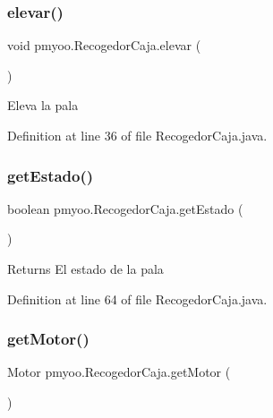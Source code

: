 \mbox{\label{classpmyoo_1_1_recogedor_caja_a94c5cdce71ce343490aa39101e551717}} 
\subsubsection{\texorpdfstring{elevar()}{elevar()}}
{\footnotesize\ttfamily void pmyoo.\+Recogedor\+Caja.\+elevar (\begin{DoxyParamCaption}{ }\end{DoxyParamCaption})}

Eleva la pala 

Definition at line 36 of file Recogedor\+Caja.\+java.

\mbox{\label{classpmyoo_1_1_recogedor_caja_a6c8a3ab0cdcfe6037f82de19791dfa39}} 
\subsubsection{\texorpdfstring{getEstado()}{getEstado()}}
{\footnotesize\ttfamily boolean pmyoo.\+Recogedor\+Caja.\+get\+Estado (\begin{DoxyParamCaption}{ }\end{DoxyParamCaption})}

\begin{DoxyReturn}{Returns}
El estado de la pala 
\end{DoxyReturn}


Definition at line 64 of file Recogedor\+Caja.\+java.

\mbox{\label{classpmyoo_1_1_recogedor_caja_a3e34ca212881d63d8d9eb5657dcc2089}} 
\subsubsection{\texorpdfstring{getMotor()}{getMotor()}}
{\footnotesize\ttfamily Motor pmyoo.\+Recogedor\+Caja.\+get\+Motor (\begin{DoxyParamCaption}{ }\end{DoxyParamCaption})}

